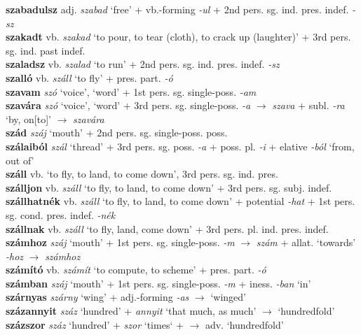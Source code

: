 \documentclass[11pt]{article}
\begin{document}
\textbf{szabadulsz} adj. \emph{szabad} `free' + vb.\hyp{}forming \emph{-ul} +
2nd pers. sg. ind. pres. indef. \emph{-sz} \\
\textbf{szakadt} vb. \emph{szakad} `to pour, to tear (cloth), to crack
up (laughter)' + 3rd pers. sg. ind. past indef. \\
\textbf{szaladsz} vb. \emph{szalad} `to run' + 2nd
pers. sg. ind. pres. indef. \emph{-sz} \\
\textbf{szalló} vb. \emph{száll} `to fly' + pres. part. \emph{-ó} \\
\textbf{szavam} \emph{szó} `voice', `word' + 1st
pers. sg. single\hyp{}poss. \emph{-am} \\
\textbf{szavára} \emph{szó} `voice', `word' + 3rd pers. sg. single\hyp{}poss. \emph{-a} $\rightarrow$ \emph{szava} + subl. \emph{-ra} `by, on[to]'
$\rightarrow$ \emph{szavára} \\
\textbf{szád} \emph{száj} `mouth' + 2nd
pers. sg. single\hyp{}poss. poss. \\
\textbf{szálaiból} \emph{szál} `thread' + 3rd
pers. sg. poss. \emph{-a} + poss. pl. \emph{-i} + elative \emph{-ból}
`from, out of' \\
\textbf{száll} vb. `to fly, to land, to come down', 3rd
pers. sg. ind. pres. \\
\textbf{szálljon} vb. \emph{száll} `to fly, to land, to come down'
+ 3rd pers. sg. subj. indef. \\
\textbf{szállhatnék} vb. \emph{száll} `to fly, to land, to come down'
+ potential \emph{-hat} + 1st pers. sg. cond. pres. indef. \emph{-nék} \\
\textbf{szállnak} vb. \emph{száll} `to fly, land, come down' + 3rd
pers. pl. ind. pres. indef. \\
\textbf{számhoz} \emph{száj} `mouth' + 1st pers. sg. single\hyp{}poss. \emph{-m} $\rightarrow$ \emph{szám} +
allat. `towards' \emph{-hoz} $\rightarrow$ \emph{számhoz} \\
\textbf{számító} vb. \emph{számít} `to compute, to scheme' +
pres. part. \emph{-ó} \\
\textbf{számban} \emph{száj} `mouth' + 1st
pers. sg. single\hyp{}poss. \emph{-m} + iness. \emph{-ban} `in' \\
\textbf{szárnyas} \emph{szárny} `wing' + adj.\hyp{}forming \emph{-as}
$\rightarrow$ `winged' \\
\textbf{százannyit} \emph{száz} `hundred' + \emph{annyit} `that much,
as much' $\rightarrow$ `hundredfold' \\
\textbf{százszor} \emph{száz} `hundred' + \emph{szor} `times` + $\rightarrow$ adv. `hundredfold' \\
\end{document}
